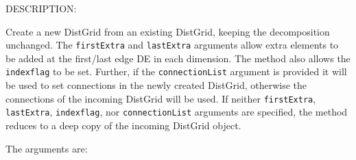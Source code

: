 {\sf DESCRIPTION:\\ }


       Create a new DistGrid from an existing DistGrid, keeping the decomposition
       unchanged. The {\tt firstExtra} and {\tt lastExtra} arguments allow extra
       elements to be added at the first/last edge DE in each dimension. The 
       method also allows the {\tt indexflag} to be set. Further, if the 
       {\tt connectionList} argument is provided it will be used to set 
       connections in the newly created DistGrid, otherwise the connections of
       the incoming DistGrid will be used.
       If neither {\tt firstExtra}, {\tt lastExtra}, {\tt indexflag}, nor 
       {\tt connectionList} arguments are specified, the method reduces to a 
       deep copy of the incoming DistGrid object.
  
       The arguments are:
